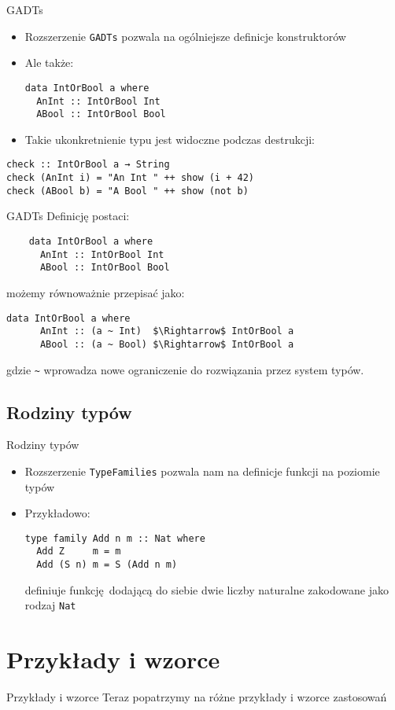 \documentclass{beamer}
\begin{document}
\begin{frame}[fragile]{GADTs}
  \begin{itemize}
    \item Rozszerzenie \lstinline!GADTs! pozwala na ogólniejsze definicje konstruktorów
    \item Ale także:
    \begin{lstlisting}
data IntOrBool a where
  AnInt :: IntOrBool Int
  ABool :: IntOrBool Bool
    \end{lstlisting}
    \item Takie ukonkretnienie typu jest widoczne podczas destrukcji:
  \end{itemize}
\begin{lstlisting}
check :: IntOrBool a → String
check (AnInt i) = "An Int " ++ show (i + 42)
check (ABool b) = "A Bool " ++ show (not b) 
\end{lstlisting}
\end{frame}

\begin{frame}[fragile]{GADTs}
  Definicję postaci:
  \begin{lstlisting}
    data IntOrBool a where
      AnInt :: IntOrBool Int
      ABool :: IntOrBool Bool
  \end{lstlisting}
  możemy równoważnie przepisać jako:
  \begin{lstlisting}[mathescape]
    data IntOrBool a where
      AnInt :: (a ~ Int)  $\Rightarrow$ IntOrBool a
      ABool :: (a ~ Bool) $\Rightarrow$ IntOrBool a
  \end{lstlisting}
  gdzie \lstinline{~} wprowadza nowe ograniczenie do rozwiązania przez system typów.
\end{frame}


\subsection{Rodziny typów}
\begin{frame}[fragile]{Rodziny typów}
  \begin{itemize}
    \item Rozszerzenie \lstinline{TypeFamilies} pozwala nam na definicje funkcji na poziomie typów
    \item Przykładowo:
\begin{lstlisting}
type family Add n m :: Nat where
  Add Z     m = m
  Add (S n) m = S (Add n m)
\end{lstlisting}
definiuje funkcję dodającą do siebie dwie liczby naturalne zakodowane jako rodzaj \lstinline!Nat!
  \end{itemize}
\end{frame}


\section{Przykłady i wzorce}
\begin{frame}{Przykłady i wzorce}
  Teraz popatrzymy na różne przykłady i wzorce zastosowań
\end{frame}
\end{document}
